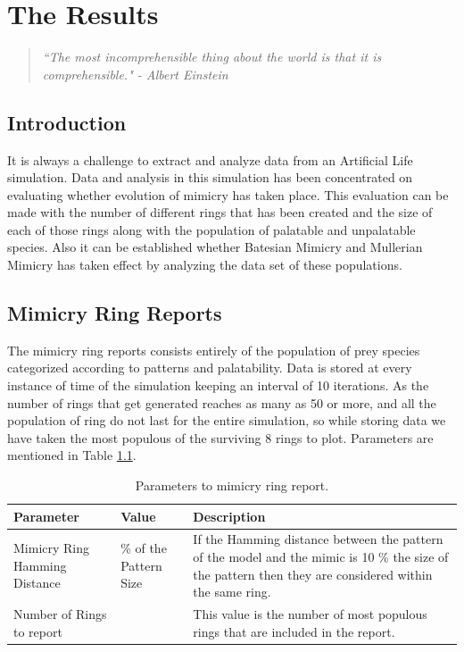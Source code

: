 \chapter{The Results}
\label{chapter:results}
\begin{quote}
\textsl{``The most incomprehensible thing about the world is that it is comprehensible." - Albert Einstein}
\end{quote}

\section{Introduction}
It is always a challenge to extract and analyze data from an Artificial Life simulation. Data and analysis in this simulation has been concentrated on evaluating whether evolution of mimicry has taken place. This evaluation can be made with the number of different rings that has been created and the size of each of those rings along with the population of palatable and unpalatable species. Also it can be established whether Batesian Mimicry and Mullerian Mimicry has taken effect by analyzing the data set of these populations.

\section{Mimicry Ring Reports}
The mimicry ring reports consists entirely of the population of prey species categorized according to patterns and palatability. Data is stored at every instance of time of the simulation keeping an interval of 10 iterations. As the number of rings that get generated reaches as many as 50 or more, and all the population of ring do not last for the entire simulation, so while storing data we have taken the most populous of the surviving 8 rings to plot. Parameters are mentioned in Table \ref{tab:ring-report-control-parameters}.

\begin{table}[H]
\centering
\begin{tabular}{| p{2cm} | >{\centering} p{2.2cm} | p{8cm} |}
	\hline
		\textbf{Parameter} & \textbf{Value} & \textbf{Description} \\ \hline
		Mimicry Ring Hamming Distance & 10 \% of the Pattern Size & If the Hamming distance between the pattern of the model and the mimic is 10 \% the size of the pattern then they are considered within the same ring.\\ \hline
		Number of Rings to report & 8 & This value is the number of most populous rings that are included in the report.\\
	\hline
\end{tabular}
\caption{Parameters to mimicry ring report.}
\label{tab:ring-report-control-parameters}
\end{table}

